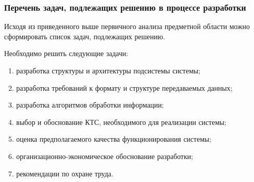 \subsubsection{Перечень задач, подлежащих решению в процессе разработки}

Исходя из приведенного выше первичного анализа предметной области можно сформировать список задач, подлежащих решению.

Необходимо решить следующие задачи:

\begin{enumerate}
\item разработка структуры и архитектуры подсистемы системы; 
\item разработка требований к формату и структуре передаваемых данных;
\item разработка алгоритмов обработки информации;
\item выбор и обоснование КТС, необходимого для реализации системы;
\item оценка предполагаемого качества функционирования системы;
\item организационно-экономическое обоснование разработки;
\item рекомендации по охране труда.
\end{enumerate}



